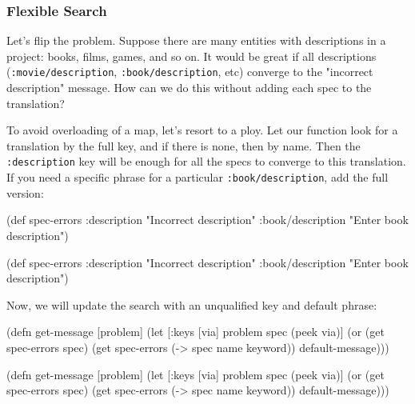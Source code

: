 \subsubsection{Flexible Search}

Let's flip the problem. Suppose there are many entities with descriptions in a project: books, films, games, and so on. It would be great if all descriptions (\verb|:movie/description|, \texttt{:book/descrip\-tion}, etc) converge to the "incorrect description" message. How can we do this without adding each spec to the translation?

To avoid overloading of a map, let's resort to a ploy. Let our function look for a translation by the full key, and if there is none, then by name. Then the \verb|:description| key will be enough for all the specs to converge to this translation. If you need a specific phrase for a particular \verb|:book/description|, add the full version:

\ifx\DEVICETYPE\MOBILE

  \begin{clojure}
(def spec-errors
  {:description
   "Incorrect description"
   :book/description
   "Enter book description"})
  \end{clojure}

\else

  \begin{clojure}
(def spec-errors
  {:description "Incorrect description"
   :book/description "Enter book description"})
  \end{clojure}

\fi

Now, we will update the search with an unqualified key and default phrase:

\ifx\DEVICETYPE\MOBILE

\begin{english}
  \begin{clojure}
(defn get-message
  [problem]
  (let [{:keys [via]} problem
        spec (peek via)]
    (or (get spec-errors spec)
        (get spec-errors
          (-> spec name keyword))
        default-message)))
  \end{clojure}
\end{english}

\else

\begin{english}
  \begin{clojure}
(defn get-message
  [problem]
  (let [{:keys [via]} problem
        spec (peek via)]
    (or (get spec-errors spec)
        (get spec-errors (-> spec name keyword))
        default-message)))
  \end{clojure}
\end{english}


